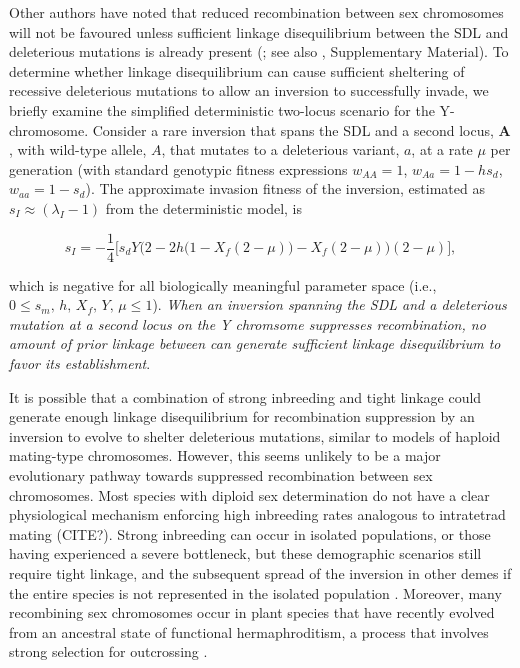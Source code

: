 \documentclass{article}
\begin{document}
Other authors have noted that reduced recombination between sex chromosomes will not be favoured unless sufficient linkage disequilibrium between the SDL and deleterious mutations is already present (\citealt{Charlesworth2017}; see also \citealt{Branco2017}, Supplementary Material). To determine whether linkage disequilibrium can cause sufficient sheltering of recessive deleterious mutations to allow an inversion to successfully invade, we briefly examine the simplified deterministic two-locus scenario for the Y-chromosome. Consider a rare inversion that spans the SDL and a second locus, $\mathbf{A}$, with wild-type allele, $A$, that mutates to a deleterious variant, $a$, at a rate $\mu$ per generation (with standard genotypic fitness expressions $w_{AA} = 1$, $w_{Aa} = 1 - h s_d$, $w_{aa} = 1 - s_d$). The approximate invasion fitness of the inversion, estimated as $s_I \approx (\lambda_I - 1)$ from the deterministic model, is 

\begin{equation}
	s_I = -\frac{1}{4} \Big[ s_d Y \Big(2 - 2 h \big(1 - X_f (2 - \mu)\big) - X_f (2 - \mu)\Big) (2 - \mu) \Big],
\end{equation}

\noindent which is negative for all biologically meaningful parameter space (i.e., $0 \leq s_m,\,h,\,X_f,\,Y,\,\mu \leq 1$). {\itshape When an inversion spanning the SDL and a deleterious mutation at a second locus on the Y chromsome suppresses recombination, no amount of prior linkage between can generate sufficient linkage disequilibrium to favor its establishment}.

It is possible that a combination of strong inbreeding and tight linkage could generate enough linkage disequilibrium for recombination suppression by an inversion to evolve to shelter deleterious mutations, similar to models of haploid mating-type chromosomes. However, this seems unlikely to be a major evolutionary pathway towards suppressed recombination between sex chromosomes. Most species with diploid sex determination do not have a clear physiological mechanism enforcing high inbreeding rates analogous to intratetrad mating (CITE?). Strong inbreeding can occur in isolated populations, or those having experienced a severe bottleneck, but these demographic scenarios still require tight linkage, and the subsequent spread of the inversion in other demes if the entire species is not represented in the isolated population \citep{Lande1979}. Moreover, many recombining sex chromosomes occur in plant species that have recently evolved from an ancestral state of functional hermaphroditism, a process that involves strong selection for outcrossing \citep{Charlesworth1978a,Olito2019}. 
\end{document}
